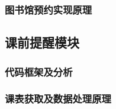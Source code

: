 \documentclass[14pt,a4paper,UTF8,twoside]{article}
\begin{document}
    \subsubsection{图书馆预约实现原理}

    \subsection{课前提醒模块}

    \subsubsection{代码框架及分析}

    \subsubsection{课表获取及数据处理原理}
\end{document}

